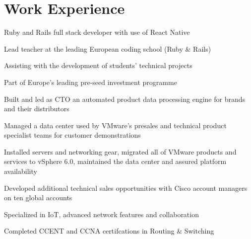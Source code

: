 \documentclass[a4paper]{alex-resume}
\begin{document}
\begin{minipage}[t]{0.58\textwidth}


\section{Work Experience}

\vspace{\topsep}
\begin{tightemize}
\item Ruby and Rails full stack developer with use of React Native
\item Lead teacher at the leading European coding school (Ruby \& Rails)
\item Assisting with the development of students' technical projects 
\end{tightemize}
\sectionsep

\begin{tightemize}
\item Part of Europe's leading pre-seed investment programme
\item Built and led as CTO an automated product data processing engine for brands and their distributors
\end{tightemize}
\sectionsep

\begin{tightemize}
\item Managed a data center used by VMware's presales and technical product specialist teams for customer demonstrations
\item Installed servers and networking gear, migrated all of VMware products and services to vSphere 6.0, maintained the data center and assured platform availability
\end{tightemize}
\sectionsep

\begin{tightemize}
\item Developed additional technical sales opportunities with Cisco account managers on ten global accounts
\item Specialized in IoT, advanced network features and collaboration
\item Completed CCENT and CCNA certifcations in Routing \& Switching
\end{tightemize}
\sectionsep


\end{minipage}
\end{document}
